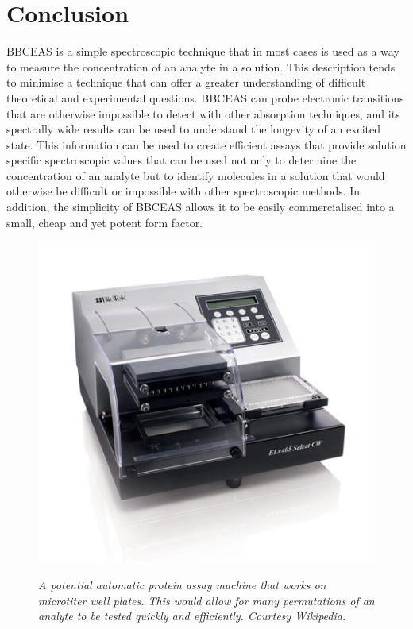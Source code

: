 \chapter{Conclusion} \label{ch:discussion}

\acl{BBCEAS} is a simple spectroscopic technique that in most cases is
used as a way to measure the concentration of an analyte in a solution.
This description tends to minimise a technique that can offer a greater
understanding of difficult theoretical and experimental questions. \ac{BBCEAS}
can probe electronic transitions that are otherwise impossible to detect with
other absorption techniques, and its spectrally wide results can be used to
understand the longevity of an excited state. This information can be used to
create efficient assays that provide solution specific spectroscopic values
that can be used not only to determine the concentration of an analyte but
to identify molecules in a solution that would otherwise be difficult or
impossible with other spectroscopic methods. In addition, the simplicity of
\ac{BBCEAS} allows it to be easily commercialised into a small, cheap and yet
potent form factor.

\begin{figure}
\begin{center}
\includegraphics[width=\marginspace]{figures/microtiter_machine.jpeg}
\end{center}
\emph{\footnotesize{ A potential automatic protein assay machine that works on microtiter well plates. This would allow for many permutations of an analyte to be tested quickly and efficiently. Courtesy Wikipedia.}}
\label{fig:microtiter}
\end{figure}

